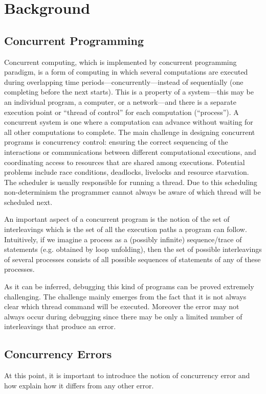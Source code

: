 \chapter{Background}
\label{Chapter 2}

\section{Concurrent Programming}

Concurrent computing, which is implemented by concurrent programming paradigm, is a form of computing in which several 
computations are executed during overlapping time 
periods—concurrently—instead of sequentially (one completing before the next starts). 
This is a property of a system—this may be an individual program, a computer, or a network—and there is a separate execution point 
or ``thread of control'' for each computation (``process''). A concurrent system is one where a computation can advance without waiting for 
all other computations to complete.
The main challenge in designing concurrent programs is concurrency control: ensuring the correct sequencing of the 
interactions or communications between different computational executions, and coordinating access to resources that are shared among executions.
Potential problems include race conditions, deadlocks, livelocks and resource starvation. 
The scheduler is usually responsible for running a thread. Due to this scheduling non-determinism the programmer cannot always be aware of which thread
will be scheduled next.

An important aspect of a concurrent program is the notion of the set of interleavings which is the set of all the execution paths a program can follow.
Intuitively, if we imagine a process as a (possibly infinite) sequence/trace of statements (e.g. obtained by loop unfolding),
then the set of possible interleavings of several processes consists of all possible sequences of statements of any of these processes.

As it can be inferred, debugging this kind of programs can be proved extremely challenging. The challenge mainly emerges from the fact that it is 
not always clear which thread command will be executed. Moreover the error may not always occur during debugging since there may be only a limited
number of interleavings that produce an error. 

\section{Concurrency Errors}
At this point, it is important to introduce the notion of concurrency error and how explain how it differs from any other error.

